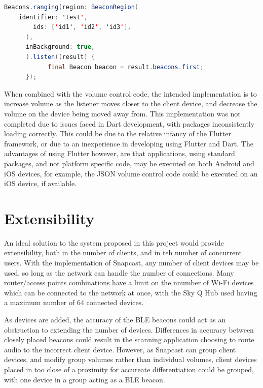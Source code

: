 \documentclass[11pt,a4paper,headinclude=false,footinclude=false]{scrreprt}
\begin{document}
\lstset{
    caption=Flutter Beacons Generic Beacon Ranging,
    basicstyle=\footnotesize, frame=tb,
    xleftmargin=.2\textwidth, xrightmargin=.2\textwidth
}

\begin{lstlisting}[language=Java]
Beacons.ranging(region: BeaconRegion(
    identifier: 'test',
        ids: ['id1', 'id2', 'id3'],
      ),
      inBackground: true,
      ).listen((result) {
            final Beacon beacon = result.beacons.first;
      });
\end{lstlisting}

When combined with the volume control code, the intended implementation
is to increase volume as the listener moves closer to the client device,
and decrease the volume on the device being moved away from. This
implementation was not completed due to issues faced in Dart
development, with packages inconsistently loading correctly. This could
be due to the relative infancy of the Flutter framework, or due to an
inexperience in developing using Flutter and Dart. The advantages of
using Flutter however, are that applications, using standard packages,
and not platform specific code, may be executed on both Android and iOS
devices, for example, the JSON volume control code could be executed on
an iOS device, if available.

\section{Extensibility}\label{extensibility}

An ideal solution to the system proposed in this project would provide
extensibility, both in the number of clients, and in teh number of
concurrent users. With the implementation of Snapcast, any number of
client devices may be used, so long as the network can handle the number
of connections. Many router/access points combinations have a limit on
the nnumber of Wi-Fi devices which can be connected to the network at
once, with the Sky Q Hub used having a maximum number of 64 connected
devices\cite{SkyQ}.

As devices are added, the accuracy of the BLE beacons could act as an
obstruction to extending the number of devices. Differences in accuracy
between closely placed beacons could result in the scanning application
choosing to route audio to the incorrect client device. However, as
Snapcast can group client devices, and modify group volumes rather than
individual volumes, client devices placed in too close of a proximity
for accureate differentiation could be grouped, with one device in a
group acting as a BLE beacon.
\end{document}
